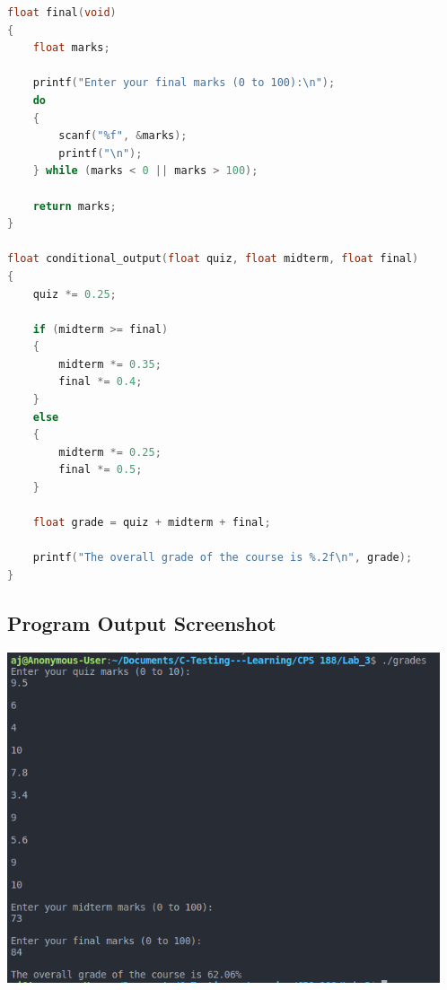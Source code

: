 \begin{lstlisting}[language=C, caption=\textit{Program to Calculate the Overall grades of a Course}]
float final(void)
{
    float marks;

    printf("Enter your final marks (0 to 100):\n");
    do 
    {
        scanf("%f", &marks);
        printf("\n");
    } while (marks < 0 || marks > 100);

    return marks;
}

float conditional_output(float quiz, float midterm, float final)
{
    quiz *= 0.25;

    if (midterm >= final)
    {
        midterm *= 0.35;
        final *= 0.4;
    }
    else
    {
        midterm *= 0.25;
        final *= 0.5;
    }

    float grade = quiz + midterm + final;

    printf("The overall grade of the course is %.2f\n", grade);
}

	\end{lstlisting}
	
	\subsection{{Program Output Screenshot}}
	
		{}
		
		\includegraphics[width=12.75cm]{grades.png}
		
		
		
